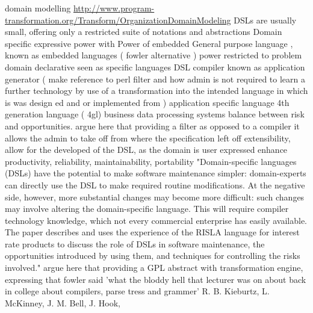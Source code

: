 domain modelling
\url{http://www.program-transformation.org/Transform/OrganizationDomainModeling}
\newline
DSLs are usually small, offering only a restricted suite of
notations and abstractions
\newline
Domain specific expressive power with Power of embedded General purpose language , known as embedded languages ( fowler alternative )
\newline
power restricted to problem domain
\newline
declarative seen as specific languages
\newline
DSL compiler known as application generator ( make reference to perl filter and how admin is not required to learn a further technology by use of a transformation into the intended language in which is was design ed and or implemented from )
\newline
application specific language
\newline
4th generation language ( 4gl) business data processing systems
\newline
balance between risk and opportunities. 
argue here that providing a filter as opposed to a compiler it allows the admin to take off from where the specification left off
\newline
extensibility, allow for the developed of the DSL, as the domain is user expressed
\newline
enhance productivity, reliability, maintainability, portability
\newline
"Domain-specific languages (DSLs) have the potential
to make software maintenance simpler: domain-experts
can directly use the DSL to make required routine modifications.
At the negative side, however, more substantial
changes may become more difficult: such changes
may involve altering the domain-specific language. This
will require compiler technology knowledge, which not
every commercial enterprise has easily available. The
paper describes and uses the experience of the RISLA
language for interest rate products to discuss the role of
DSLs in software maintenance, the opportunities introduced
by using them, and techniques for controlling the
risks involved."
\newline
argue here that providing a GPL abstract with  transformation engine, expressing that fowler said 'what the bloddy hell that lecturer was on about back in college about compilers, parse tress and grammer'
\newline
R. B. Kieburtz, L. McKinney, J. M. Bell, J. Hook,
